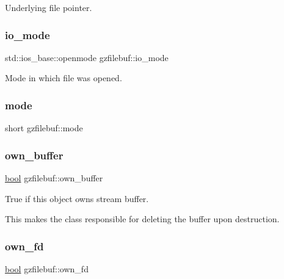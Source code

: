 Underlying file pointer. \mbox{\label{classgzfilebuf_a30b7bb833856a68054d8aec490a8c735}} 
\subsubsection{\texorpdfstring{io\+\_\+mode}{io\_mode}}
{\footnotesize\ttfamily std\+::ios\+\_\+base\+::openmode gzfilebuf\+::io\+\_\+mode\hspace{0.3cm}{\ttfamily [private]}}

Mode in which file was opened. \mbox{\label{classgzfilebuf_a4b67ec1d75c34ba33b2a66639959a8b8}} 
\subsubsection{\texorpdfstring{mode}{mode}}
{\footnotesize\ttfamily short gzfilebuf\+::mode\hspace{0.3cm}{\ttfamily [private]}}

\mbox{\label{classgzfilebuf_ac82c6cf702b67123490f2ed51f00c971}} 
\subsubsection{\texorpdfstring{own\+\_\+buffer}{own\_buffer}}
{\footnotesize\ttfamily \mbox{\hyperlink{libretro_8h_a4a26dcae73fb7e1528214a068aca317e}{bool}} gzfilebuf\+::own\+\_\+buffer\hspace{0.3cm}{\ttfamily [private]}}



True if this object owns stream buffer. 

This makes the class responsible for deleting the buffer upon destruction. \mbox{\label{classgzfilebuf_a30e53855a87d4387b0722e335e886a83}} 
\subsubsection{\texorpdfstring{own\+\_\+fd}{own\_fd}}
{\footnotesize\ttfamily \mbox{\hyperlink{libretro_8h_a4a26dcae73fb7e1528214a068aca317e}{bool}} gzfilebuf\+::own\+\_\+fd\hspace{0.3cm}{\ttfamily [private]}}



